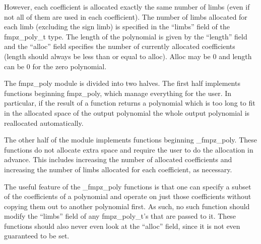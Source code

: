 \documentclass[a4paper,10pt]{article}
\begin{document}
However, each coefficient is allocated exactly the same number of limbs (even if not all of them are used in each coefficient). The number of limbs allocated for each limb (excluding the sign limb) is specified in the ``limbs'' field of the fmpz\_poly\_t type. The length of the polynomial is given by the ``length'' field and the ``alloc'' field specifies the number of currently allocated coefficients (length should always be less than or equal to alloc). Alloc may be 0 and length can be 0 for the zero polynomial. 

The fmpz\_poly module is divided into two halves. The first half implements functions beginning fmpz\_poly, which manage everything for the user. In particular, if the result of a function returns a polynomial which is too long to fit in the allocated space of the output polynomial the whole output polynomial is reallocated automatically.

The other half of the module implements functions beginning \_fmpz\_poly. These functions do not allocate extra space and require the user to do the allocation in advance. This includes increasing the number of allocated coefficients and increasing the number of limbs allocated for each coefficient, as necessary.

The useful feature of the \_fmpz\_poly functions is that one can specify a subset of the coefficients of a polynomial and operate on just those coefficients without copying them out to another polynomial first. As such, no such function should modify the ``limbs'' field of any fmpz\_poly\_t's that are passed to it. These functions should also never even look at the ``alloc'' field, since it is not even guaranteed to be set. 
\end{document}

